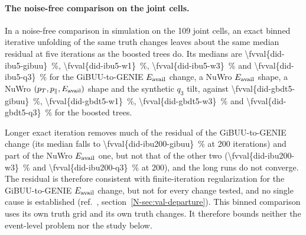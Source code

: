 
\paragraph{The noise-free comparison on the joint cells.} In a noise-free comparison in simulation on the 109 joint cells, an exact binned iterative unfolding of the same truth changes leaves about the same median residual at five iterations as the boosted trees do. Its medians are \SI{\fvval{did-ibu5-gibuu}}{\percent}, \SI{\fvval{did-ibu5-w1}}{\percent}, \SI{\fvval{did-ibu5-w3}}{\percent} and \SI{\fvval{did-ibu5-q3}}{\percent} for the GiBUU-to-GENIE $E_{\mathrm{avail}}$ change, a NuWro $E_{\mathrm{avail}}$ shape, a NuWro $(p_{T},p_{\parallel},E_{\mathrm{avail}})$ shape and the synthetic $q_3$ tilt, against \SI{\fvval{did-gbdt5-gibuu}}{\percent}, \SI{\fvval{did-gbdt5-w1}}{\percent}, \SI{\fvval{did-gbdt5-w3}}{\percent} and \SI{\fvval{did-gbdt5-q3}}{\percent} for the boosted trees.

Longer exact iteration removes much of the residual of the GiBUU-to-GENIE change (its median falls to \SI{\fvval{did-ibu200-gibuu}}{\percent} at 200 iterations) and part of the NuWro $E_{\mathrm{avail}}$ one, but not that of the other two (\SI{\fvval{did-ibu200-w3}}{\percent} and \SI{\fvval{did-ibu200-q3}}{\percent} at 200), and the long runs do not converge. The residual is therefore consistent with finite-iteration regularization for the GiBUU-to-GENIE $E_{\mathrm{avail}}$ change, but not for every change tested, and no single cause is established (ref.~\cite{AnalysisNote2026}, section~\ref*{N-sec:val-departure}). This binned comparison uses its own truth grid and its own truth changes. It therefore bounds neither the event-level problem nor the study below.

